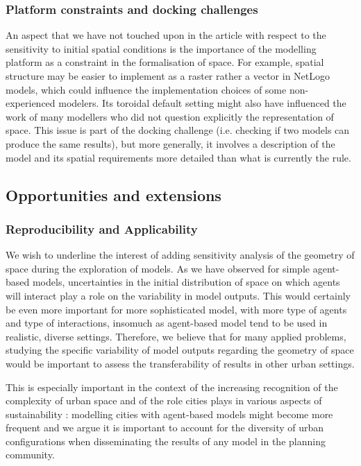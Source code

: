 \documentclass{JASSS}
\begin{document}
\subsubsection{Platform constraints and docking challenges}

An aspect that we have not touched upon in the article with respect to the sensitivity to initial spatial conditions is the importance of the modelling platform as a constraint in the formalisation of space. For example, spatial structure may be easier to implement as a raster rather a vector in NetLogo models, which could influence the implementation choices of some non-experienced modelers. Its toroidal default setting might also have influenced the work of many modellers who did not question explicitly the representation of space. This issue is part of the docking challenge \citep{Axtelletal1996} (i.e. checking if two models can produce the same results), but more generally, it involves a description of the model and its spatial requirements more detailed than what is currently the rule.



\subsection{Opportunities and extensions}


\subsubsection{Reproducibility and Applicability} 


We wish to underline the interest of adding sensitivity analysis of the geometry of space during the exploration of models. As we have observed for simple agent-based models, uncertainties in the initial distribution of space on which agents will interact play a role on the variability in model outputs. This would certainly be even more important for more sophisticated model, with more type of agents and type of interactions, insomuch as agent-based model tend to be used in realistic, diverse settings. Therefore, we believe that for many applied problems, studying the specific variability of model outputs regarding the geometry of space would be important to assess the transferability of results in other urban settings.

This is especially important in the context of the increasing recognition of the complexity of urban space and of the role cities plays in various aspects of sustainability : modelling cities with agent-based models might become more frequent \citep{perez2016agent} and we argue it is important to account for the diversity of urban configurations when disseminating the results of any model in the planning community.
\end{document}
